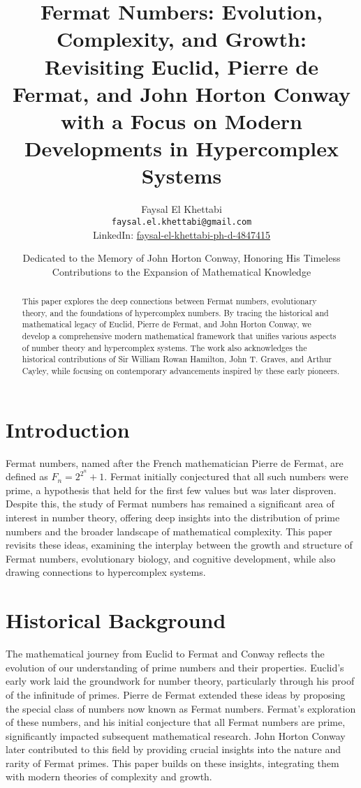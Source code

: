\documentclass[12pt]{article}
\date{Dedicated to the Memory of John Horton Conway, Honoring His Timeless Contributions to the Expansion of Mathematical Knowledge}
\title{Fermat Numbers: Evolution, Complexity, and Growth:\\
Revisiting Euclid, Pierre de Fermat, and John Horton Conway \\
with a Focus on Modern Developments in Hypercomplex Systems}
\author{Faysal El Khettabi \\
\texttt{faysal.el.khettabi@gmail.com} \\
LinkedIn: \href{https://www.linkedin.com/in/faysal-el-khettabi-ph-d-4847415/}{faysal-el-khettabi-ph-d-4847415}
}
\begin{document}
\maketitle

\begin{abstract}
This paper explores the deep connections between Fermat numbers, evolutionary theory, and the foundations of hypercomplex numbers. By tracing the historical and mathematical legacy of Euclid, Pierre de Fermat, and John Horton Conway, we develop a comprehensive modern mathematical framework that unifies various aspects of number theory and hypercomplex systems. The work also acknowledges the historical contributions of Sir William Rowan Hamilton, John T. Graves, and Arthur Cayley, while focusing on contemporary advancements inspired by these early pioneers.
\end{abstract}

\section{Introduction}

Fermat numbers, named after the French mathematician Pierre de Fermat, are defined as \( F_n = 2^{2^n} + 1 \). Fermat initially conjectured that all such numbers were prime, a hypothesis that held for the first few values but was later disproven. Despite this, the study of Fermat numbers has remained a significant area of interest in number theory, offering deep insights into the distribution of prime numbers and the broader landscape of mathematical complexity. This paper revisits these ideas, examining the interplay between the growth and structure of Fermat numbers, evolutionary biology, and cognitive development, while also drawing connections to hypercomplex systems.

\section{Historical Background}

The mathematical journey from Euclid to Fermat and Conway reflects the evolution of our understanding of prime numbers and their properties. Euclid's early work laid the groundwork for number theory, particularly through his proof of the infinitude of primes. Pierre de Fermat extended these ideas by proposing the special class of numbers now known as Fermat numbers. Fermat's exploration of these numbers, and his initial conjecture that all Fermat numbers are prime, significantly impacted subsequent mathematical research. John Horton Conway later contributed to this field by providing crucial insights into the nature and rarity of Fermat primes. This paper builds on these insights, integrating them with modern theories of complexity and growth.
\end{document}
